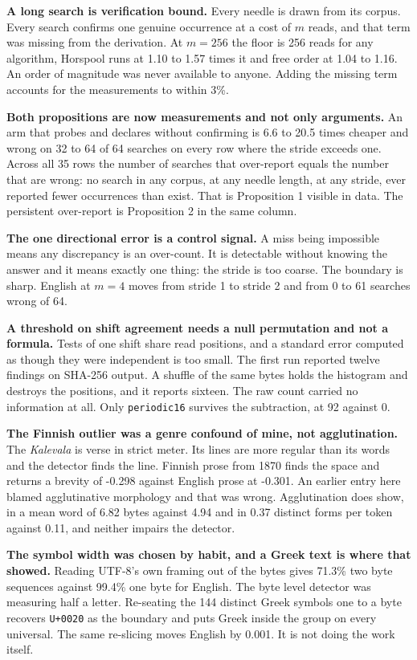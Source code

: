 \textbf{A long search is verification bound.} Every needle is drawn from its corpus. Every search confirms one genuine occurrence at a cost of \(m\) reads, and that term was missing from the derivation. At \(m = 256\) the floor is 256 reads for any algorithm, Horspool runs at 1.10 to 1.57 times it and free order at 1.04 to 1.16. An order of magnitude was never available to anyone. Adding the missing term accounts for the measurements to within 3\%.

\textbf{Both propositions are now measurements and not only arguments.} An arm that probes and declares without confirming is 6.6 to 20.5 times cheaper and wrong on 32 to 64 of 64 searches on every row where the stride exceeds one. Across all 35 rows the number of searches that over-report equals the number that are wrong: no search in any corpus, at any needle length, at any stride, ever reported fewer occurrences than exist. That is Proposition 1 visible in data. The persistent over-report is Proposition 2 in the same column.

\textbf{The one directional error is a control signal.} A miss being impossible means any discrepancy is an over-count. It is detectable without knowing the answer and it means exactly one thing: the stride is too coarse. The boundary is sharp. English at \(m = 4\) moves from stride 1 to stride 2 and from 0 to 61 searches wrong of 64.

\textbf{A threshold on shift agreement needs a null permutation and not a formula.} Tests of one shift share read positions, and a standard error computed as though they were independent is too small. The first run reported twelve findings on SHA-256 output. A shuffle of the same bytes holds the histogram and destroys the positions, and it reports sixteen. The raw count carried no information at all. Only \texttt{periodic16} survives the subtraction, at 92 against 0.

\textbf{The Finnish outlier was a genre confound of mine, not agglutination.} The \emph{Kalevala} is verse in strict meter. Its lines are more regular than its words and the detector finds the line. Finnish prose from 1870 finds the space and returns a brevity of -0.298 against English prose at -0.301. An earlier entry here blamed agglutinative morphology and that was wrong. Agglutination does show, in a mean word of 6.82 bytes against 4.94 and in 0.37 distinct forms per token against 0.11, and neither impairs the detector.

\textbf{The symbol width was chosen by habit, and a Greek text is where that showed.} Reading UTF-8's own framing out of the bytes gives 71.3\% two byte sequences against 99.4\% one byte for English. The byte level detector was measuring half a letter. Re-seating the 144 distinct Greek symbols one to a byte recovers \texttt{U+0020} as the boundary and puts Greek inside the group on every universal. The same re-slicing moves English by 0.001. It is not doing the work itself.

